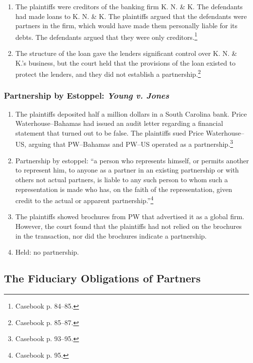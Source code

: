 \begin{enumerate}
    \item The plaintiffs were creditors of the banking firm K. N. \& K. The 
    defendants had made loans to K. N. \& K. The plaintiffs argued that the 
    defendants were partners in the firm, which would have made them 
    personally liable for its debts. The defendants argued that they were only 
    creditors.\footnote{Casebook p. 84--85.}
    \item The structure of the loan gave the lenders significant control over 
    K. N. \& K.'s business, but the court held that the provisions of the loan 
    existed to protect the lenders, and they did not establish a 
    partnership.\footnote{Casebook p. 85--87.}
\end{enumerate}

\subsubsection{Partnership by Estoppel: \emph{Young v. Jones}}
\label{par:young}
\begin{enumerate}
    \item The plaintiffs deposited half a million dollars in a South Carolina 
    bank. Price Waterhouse--Bahamas had issued an audit letter regarding a 
    financial statement that turned out to be false. The plaintiffs sued Price 
    Waterhouse--US, arguing that PW--Bahamas and PW--US operated as a 
    partnership.\footnote{Casebook p. 93--95.}
    \item Partnership by estoppel: ``a person who represents himself, or 
    permits another to represent him, to anyone as a partner in an existing 
    partnership or with others not actual partners, is liable to any such 
    person to whom such a representation is made who has, on the faith of the 
    representation, given credit to the actual or apparent 
    partnership.''\footnote{Casebook p. 95.}
    \item The plaintiffs showed brochures from PW that advertised it as a 
    global firm. However, the court found that the plaintiffs had not relied 
    on the brochures in the transaction, nor did the brochures indicate a 
    partnership.
    \item Held: no partnership.
\end{enumerate}

\subsection{The Fiduciary Obligations of Partners}

